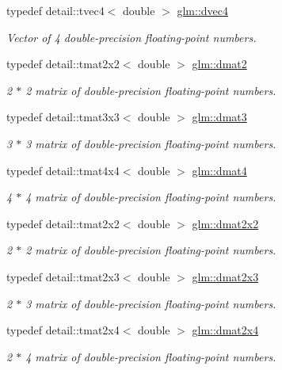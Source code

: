 \begin{DoxyCompactItemize}
typedef detail\-::tvec4$<$ double $>$ \hyperlink{group__core__types_ga0127b78c4c51b270b2a2ef848c01b5d9}{glm\-::dvec4}
\begin{DoxyCompactList}\small\item\em Vector of 4 double-\/precision floating-\/point numbers. \end{DoxyCompactList}\item 
typedef detail\-::tmat2x2$<$ double $>$ \hyperlink{group__core__types_gaa53909085d199392937e3933af5410a1}{glm\-::dmat2}
\begin{DoxyCompactList}\small\item\em 2 $\ast$ 2 matrix of double-\/precision floating-\/point numbers. \end{DoxyCompactList}\item 
typedef detail\-::tmat3x3$<$ double $>$ \hyperlink{group__core__types_ga557f8357220829c6a6a3e28640e33507}{glm\-::dmat3}
\begin{DoxyCompactList}\small\item\em 3 $\ast$ 3 matrix of double-\/precision floating-\/point numbers. \end{DoxyCompactList}\item 
typedef detail\-::tmat4x4$<$ double $>$ \hyperlink{group__core__types_ga68b5efb5d529f9031481ef36f9babd96}{glm\-::dmat4}
\begin{DoxyCompactList}\small\item\em 4 $\ast$ 4 matrix of double-\/precision floating-\/point numbers. \end{DoxyCompactList}\item 
typedef detail\-::tmat2x2$<$ double $>$ \hyperlink{group__core__types_ga2c1de969d1d8cfcb297dbfa476b33dc8}{glm\-::dmat2x2}
\begin{DoxyCompactList}\small\item\em 2 $\ast$ 2 matrix of double-\/precision floating-\/point numbers. \end{DoxyCompactList}\item 
typedef detail\-::tmat2x3$<$ double $>$ \hyperlink{group__core__types_gadba2f0efb492f511466de9784b0e07cd}{glm\-::dmat2x3}
\begin{DoxyCompactList}\small\item\em 2 $\ast$ 3 matrix of double-\/precision floating-\/point numbers. \end{DoxyCompactList}\item 
typedef detail\-::tmat2x4$<$ double $>$ \hyperlink{group__core__types_gaa97c63383e2dc472510d77409a7d5001}{glm\-::dmat2x4}
\begin{DoxyCompactList}\small\item\em 2 $\ast$ 4 matrix of double-\/precision floating-\/point numbers. \end{DoxyCompactList}\item 

\end{DoxyCompactItemize}
